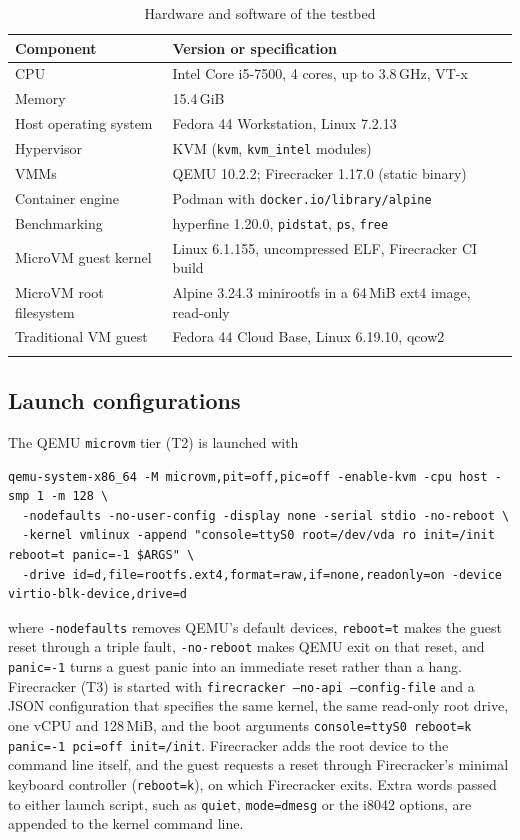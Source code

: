 \documentclass[pdflatex,sn-mathphys-num]{sn-jnl}%
\begin{document}
\begin{table}[ht]
\caption{Hardware and software of the testbed}\label{tab:testbed}
\footnotesize
\begin{tabular}{@{}ll@{}}
\toprule
Component & Version or specification \\
\midrule
CPU & Intel Core i5-7500, 4 cores, up to 3.8\,GHz, VT-x \\
Memory & 15.4\,GiB \\
Host operating system & Fedora 44 Workstation, Linux 7.2.13 \\
Hypervisor & KVM (\texttt{kvm}, \texttt{kvm\_intel} modules) \\
VMMs & QEMU 10.2.2; Firecracker 1.17.0 (static binary) \\
Container engine & Podman with \texttt{docker.io/library/alpine} \\
Benchmarking & hyperfine 1.20.0, \texttt{pidstat}, \texttt{ps}, \texttt{free} \\
MicroVM guest kernel & Linux 6.1.155, uncompressed ELF, Firecracker CI build \\
MicroVM root filesystem & Alpine 3.24.3 minirootfs in a 64\,MiB ext4 image, read-only \\
Traditional VM guest & Fedora 44 Cloud Base, Linux 6.19.10, qcow2 \\
\botrule
\end{tabular}
\end{table}

\subsection{Launch configurations}

The QEMU \texttt{microvm} tier (T2) is launched with
\begin{lstlisting}
qemu-system-x86_64 -M microvm,pit=off,pic=off -enable-kvm -cpu host -smp 1 -m 128 \
  -nodefaults -no-user-config -display none -serial stdio -no-reboot \
  -kernel vmlinux -append "console=ttyS0 root=/dev/vda ro init=/init reboot=t panic=-1 $ARGS" \
  -drive id=d,file=rootfs.ext4,format=raw,if=none,readonly=on -device virtio-blk-device,drive=d
\end{lstlisting}
where \texttt{-nodefaults} removes QEMU's default devices, \texttt{reboot=t} makes the guest reset through a triple fault, \texttt{-no-reboot} makes QEMU exit on that reset, and \texttt{panic=-1} turns a guest panic into an immediate reset rather than a hang. Firecracker (T3) is started with \texttt{firecracker --no-api --config-file} and a JSON configuration that specifies the same kernel, the same read-only root drive, one vCPU and 128\,MiB, and the boot arguments \texttt{console=ttyS0 reboot=k panic=-1 pci=off init=/init}. Firecracker adds the root device to the command line itself, and the guest requests a reset through Firecracker's minimal keyboard controller (\texttt{reboot=k}), on which Firecracker exits. Extra words passed to either launch script, such as \texttt{quiet}, \texttt{mode=dmesg} or the i8042 options, are appended to the kernel command line.
\end{document}

